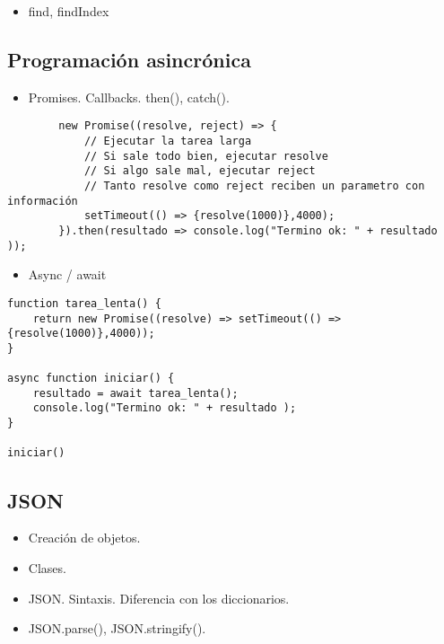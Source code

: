 \begin{itemize}
\tightlist
\item
  find, findIndex
\end{itemize}

\hypertarget{programaciuxf3n-asincruxf3nica}{%
\subsection{Programación
asincrónica}\label{programaciuxf3n-asincruxf3nica}}

\begin{itemize}
\tightlist
\item
  Promises. Callbacks. then(), catch().
\end{itemize}

\begin{verbatim}
        new Promise((resolve, reject) => {
            // Ejecutar la tarea larga
            // Si sale todo bien, ejecutar resolve
            // Si algo sale mal, ejecutar reject
            // Tanto resolve como reject reciben un parametro con información
            setTimeout(() => {resolve(1000)},4000);
        }).then(resultado => console.log("Termino ok: " + resultado ));
\end{verbatim}

\begin{itemize}
\tightlist
\item
  Async / await
\end{itemize}

\begin{verbatim}
function tarea_lenta() {
    return new Promise((resolve) => setTimeout(() => {resolve(1000)},4000));
}

async function iniciar() {
    resultado = await tarea_lenta();
    console.log("Termino ok: " + resultado );
}

iniciar()
\end{verbatim}

\hypertarget{json}{%
\subsection{JSON}\label{json}}

\begin{itemize}
\tightlist
\item
  Creación de objetos.
\item
  Clases.
\item
  JSON. Sintaxis. Diferencia con los diccionarios.
\item
  JSON.parse(), JSON.stringify().
\end{itemize}

